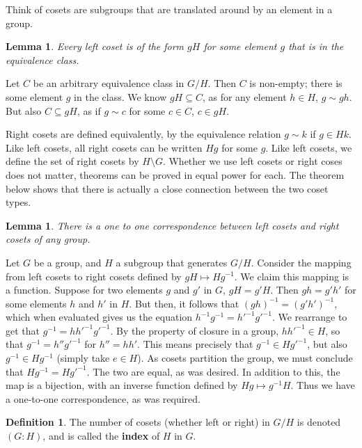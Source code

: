 \documentclass[12pt]{amsbook}
\makeatletter
\theoremstyle{plain}
\newtheorem{lemma}[theorem]{Lemma}
\theoremstyle{definition}
\newtheorem{definition}{Definition}
\renewenvironment{proof}[1][\proofname]{\par
  \pushQED{\qed}%
  \normalfont \topsep6\p@\@plus6\p@\relax
  \list{}{\leftmargin=0em
          \rightmargin=\leftmargin
          \settowidth{\itemindent}{\itshape#1}%
          \labelwidth=\itemindent}

  \item[\hskip\labelsep
        \itshape
    #1\@addpunct{.}]\ignorespaces
}{%
  \popQED\endlist\@endpefalse
}
\makeatother
\begin{document}
Think of cosets are subgroups that are translated around by an element in a group.

\begin{lemma}
    Every left coset is of the form $gH$ for some element $g$ that is in the equivalence class.
\end{lemma}
\begin{proof}
    Let $C$ be an arbitrary equivalence class in $G/H$. Then $C$ is non-empty; there is some element $g$ in the class. We know $gH \subseteq C$, as for any element $h \in H$, $g \sim gh$. But also $C \subseteq gH$, as if $g \sim c$ for some $c \in C$, $c \in gH$.
\end{proof}

Right cosets are defined equivalently, by the equivalence relation $g \sim k$ if $g \in Hk$. Like left cosets, all right cosets can be written $Hg$ for some $g$. Like left cosets, we define the set of right cosets by $H \setminus G$. Whether we use left cosets or right coses does not matter, theorems can be proved in equal power for each. The theorem below shows that there is actually a close connection between the two coset types.

\begin{lemma} There is a one to one correspondence between left cosets and right cosets of any group. \end{lemma}
\begin{proof}
Let $G$ be a group, and $H$ a subgroup that generates $G/H$. Consider the mapping from left cosets to right cosets defined by $gH \mapsto Hg^{-1}$. We claim this mapping is a function. Suppose for two elements $g$ and $g'$ in $G$, $gH = g'H$. Then $gh = g'h'$ for some elements $h$ and $h'$ in $H$. But then, it follows that $(gh)^{-1} = (g'h')^{-1}$, which when evaluated gives us the equation $h^{-1}g^{-1} = h'^{-1}g'^{-1}$. We rearrange to get that $g^{-1} = hh'^{-1}g'^{-1}$. By the property of closure in a group, $hh'^{-1} \in H$, so that $g^{-1} = h''g'^{-1}$ for $h'' = hh'$. This means precisely that $g^{-1} \in Hg'^{-1}$, but also $g^{-1} \in Hg^{-1}$ (simply take $e \in H$). As cosets partition the group, we must conclude that $Hg^{-1} = Hg'^{-1}$. The two are equal, as was desired. In addition to this, the map is a bijection, with an inverse function defined by $Hg \mapsto g^{-1}H$. Thus we have a one-to-one correspondence, as was required.
\end{proof}

\begin{definition}
    The number of cosets (whether left or right) in $G/H$ is denoted $(G:H)$, and is called the {\bf index}  of $H$ in $G$.
\end{definition}
\end{document}
